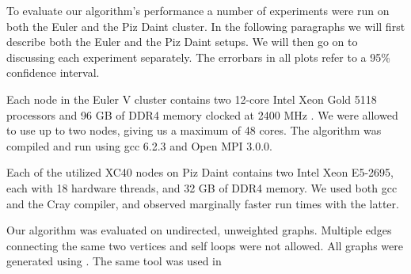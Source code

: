 To evaluate our algorithm's performance a number of experiments were run on both the Euler and the
Piz Daint cluster. In the following paragraphs we will first describe both the Euler and the Piz
Daint setups. We will then go on to discussing each experiment separately. The errorbars in all plots refer to a 95\% confidence interval.

Each node in the Euler V cluster contains two 12-core Intel Xeon Gold 5118 processors and 96 GB of
DDR4 memory clocked at 2400 MHz \cite{Euler}. We were allowed to use up to two nodes, giving us a
maximum of 48 cores. The algorithm was compiled and run using gcc 6.2.3 and Open MPI 3.0.0.

Each of the utilized XC40 nodes on Piz Daint contains two Intel Xeon E5-2695, each with 18 hardware
threads,
and 32 GB of DDR4 memory. We used both gcc and the Cray compiler, and observed marginally faster
run times with the latter.

Our algorithm was evaluated on undirected, unweighted graphs. Multiple edges connecting the same
two vertices and self loops were not allowed. All graphs were generated using \cite{Parmat}. The same tool was used in \cite{comm_avoiding}


